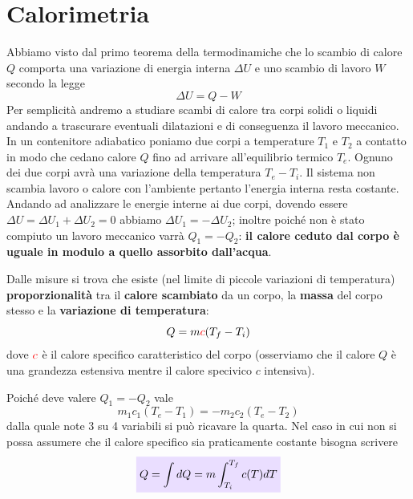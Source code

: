 \documentclass[x11names]{report}
\newcommand{\viola}[1]{\colorbox{yred}{$\displaystyle #1$}}
\begin{document}
	
	\section{Calorimetria}
	Abbiamo visto dal primo teorema della termodinamiche che lo scambio di calore \(Q\) comporta una variazione di energia interna \(\Delta U\) e uno scambio di lavoro \(W\) secondo la legge
	\[ 
	\Delta U = Q -W
	\]
	Per semplicità andremo a studiare scambi di calore tra corpi solidi o liquidi andando a trascurare eventuali dilatazioni e di conseguenza il lavoro meccanico. \\
	
	\noindent
	In un contenitore adiabatico poniamo due corpi a temperature \(T_1\) e \(T_2\) a contatto  in modo che cedano calore \(Q\) fino ad arrivare all'equilibrio termico \(T_e\). Ognuno dei due corpi avrà una variazione della temperatura \(T_{e} - T_i\). 
	Il sistema non scambia lavoro o calore con l'ambiente pertanto l'energia interna resta costante. Andando ad analizzare le energie interne ai due corpi, dovendo essere \(\Delta U = \Delta U_1 + \Delta U_2 = 0\) abbiamo \(\Delta U_1 = -\Delta U_2\); inoltre poiché non è stato compiuto un lavoro meccanico varrà \(Q_1 = -Q_2\): \textbf{il calore ceduto dal corpo è uguale in modulo a quello assorbito dall'acqua}.
	
	
	Dalle misure si trova che esiste (nel limite di piccole variazioni di temperatura) \textbf{proporzionalità} tra il \textbf{calore scambiato} da un corpo, la \textbf{massa} del corpo stesso e la \textbf{variazione di temperatura}:
	\[ 
	Q = m \textcolor{red}{c}(T_f - T_i)
	\]
	dove \(\textcolor{red}{c}\) è il calore specifico caratteristico del corpo (osserviamo che il calore \(Q\) è una grandezza estensiva mentre il calore specivico \(c\) intensiva).
	
	Poiché deve valere \(Q_1 = -Q_2\) vale
	\[ 
	m_1 c_1(T_e - T_1) = -m_2 c_2(T_e - T_2)
	\]
	dalla quale note 3 su 4 variabili si può ricavare la quarta. Nel caso in cui non si possa assumere che il calore specifico sia praticamente costante bisogna scrivere
	\begin{equation}
		\viola{Q = \int dQ = m \int_{T_i}^{T_{f}}c(T)dT}
	\end{equation}
	
	
\end{document}
